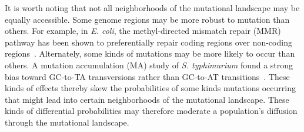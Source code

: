 \documentclass[10pt,letterpaper,final]{article}
\begin{document}
It is worth noting that not all neighborhoods of the mutational landscape may be equally accessible. Some genome regions may be more robust to mutation than others.
For example, in \textit{E. coli}, the methyl-directed mismatch repair (MMR) pathway has been shown to preferentially repair coding regions over non-coding regions~\cite{lee_rate_2012}. Alternately, some kinds of mutations may be more likely to occur than others. A mutation accumulation (MA) study of \textit{S. typhimurium} found a strong bias toward GC-to-TA transversions rather than GC-to-AT transitions~\cite{lind_whole-genome_2008}.
These kinds of effects thereby skew the probabilities of some kinds mutations occurring that might lead into certain neighborhoods of the mutational landscape. These kinds of differential probabilities may therefore moderate a population's diffusion through the mutational landscape.
%
%
\end{document}
